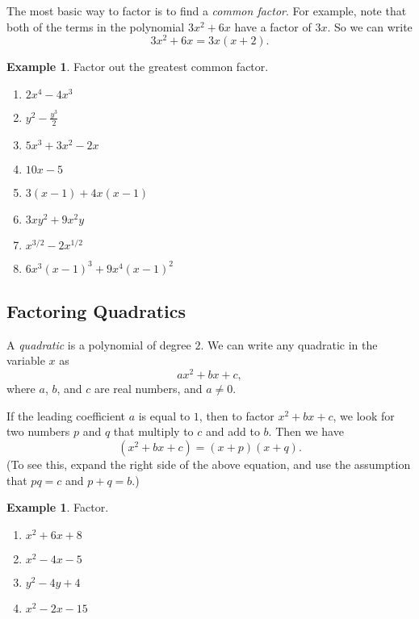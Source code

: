 \documentclass[letterpaper,12pt,oneside]{book}
\theoremstyle{definition}
\newtheorem{example}[theorem]{Example}
\begin{document}
The most basic way to factor is to find a \emph{common factor}.  For example, note that both of the terms in the polynomial $3x^2+6x$ have a factor of $3x$.  So we can write
\[
3x^2+6x=3x(x+2).
\]

\begin{example}
Factor out the greatest common factor.
\begin{multicols}{2}
\begin{enumerate}
\item $2x^4-4x^3$
\vspace{0.4cm}
\item $y^2-\frac{y^3}{2}$
\vspace{0.4cm}
\item $5x^3+3x^2-2x$
\vspace{0.4cm}
\item $10x-5$
\vspace{0.4cm}
\item $3(x-1)+4x(x-1)$
\vspace{0.4cm}
\item $3xy^2+9x^2y$
\vspace{0.5cm}
\item $x^{3/2}-2x^{1/2}$
\vspace{0.5cm}
\item $6x^3(x-1)^3+9x^4(x-1)^2$
\vspace{1.5cm}\null
\end{enumerate}
\end{multicols}
\vspace{0.5cm}
\end{example}

\subsection*{Factoring Quadratics}

A \emph{quadratic} is a polynomial of degree $2$.  We can write any quadratic in the variable $x$ as
\[
ax^2+bx+c,
\]
where $a$, $b$, and $c$ are real numbers, and $a\neq 0$.

If the leading coefficient $a$ is equal to $1$, then to factor $x^2+bx+c$, we look for two numbers $p$ and $q$ that multiply to $c$ and add to $b$.  Then we have
\[
(x^2+bx+c)=(x+p)(x+q).
\]
(To see this, expand the right side of the above equation, and use the assumption that $pq=c$ and $p+q=b$.)

\begin{example}
Factor.
\begin{multicols*}{2}
\begin{enumerate}
\item $x^2+6x+8$
\vfill\null
\item $x^2-4x-5$
\vfill\null
\columnbreak
\item $y^2-4y+4$
\vfill\null
\item $x^2-2x-15$
\vfill\null
\end{enumerate}
\end{multicols*}
\end{example}
\end{document}
